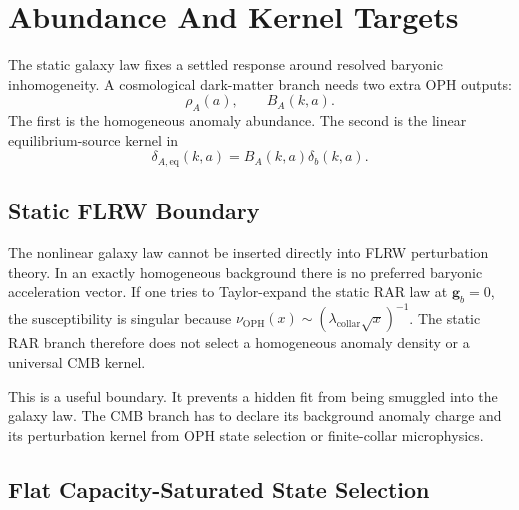 \documentclass[11pt]{article}
\newcommand{\OPH}{\mathrm{OPH}}
\newcommand{\lambdac}{\lambda_{\mathrm{collar}}}
\begin{document}
\section{Abundance And Kernel Targets}

The static galaxy law fixes a settled response around resolved baryonic
inhomogeneity.  A cosmological dark-matter branch needs two extra OPH outputs:
\begin{equation}
  \rho_A(a),
  \qquad
  B_A(k,a).
\end{equation}
The first is the homogeneous anomaly abundance.  The second is the linear
equilibrium-source kernel in
\begin{equation}
  \delta_{A,\mathrm{eq}}(k,a)=B_A(k,a)\delta_b(k,a).
\end{equation}

\subsection{Static FLRW Boundary}

The nonlinear galaxy law cannot be inserted directly into FLRW perturbation
theory.  In an exactly homogeneous background there is no preferred baryonic
acceleration vector.  If one tries to Taylor-expand the static RAR law at
\(\mathbf g_b=0\), the susceptibility is singular because
\(\nu_{\OPH}(x)\sim(\lambdac\sqrt{x})^{-1}\).  The static RAR branch therefore
does not select a homogeneous anomaly density or a universal CMB kernel.

This is a useful boundary.  It prevents a hidden fit from being smuggled into
the galaxy law.  The CMB branch has to declare its background anomaly charge
and its perturbation kernel from OPH state selection or finite-collar
microphysics.

\subsection{Flat Capacity-Saturated State Selection}
\end{document}
